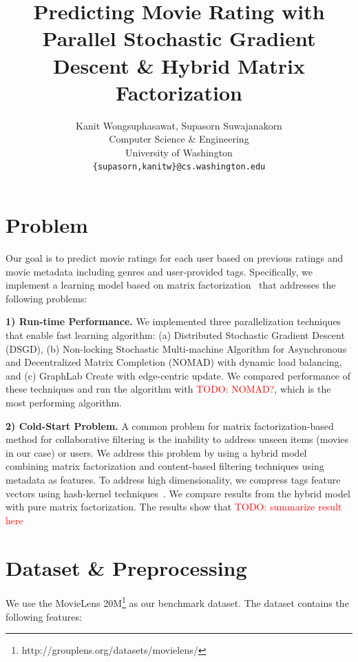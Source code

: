 \documentclass{article} %
\title{Predicting Movie Rating with Parallel Stochastic Gradient Descent \& Hybrid Matrix Factorization}
\author{
Kanit Wongsuphasawat, Supasorn Suwajanakorn \\
Computer Science \& Engineering\\
University of Washington\\
\texttt{\{supasorn,kanitw\}@cs.washington.edu} \\
}
\newcommand{\todo}[1]{\textcolor{red}{TODO: #1}}
\begin{document}
\maketitle



\section{Problem}

Our goal is to predict movie ratings for each user based on previous ratings
and movie metadata including genres and user-provided tags.
Specifically, we implement a learning model based on matrix
factorization~\cite{koren:matrix} that addresses the following problems:

\textbf{1) Run-time Performance.}
We implemented three parallelization techniques that enable fast
learning algorithm:
(a) Distributed Stochastic Gradient Descent (DSGD),
(b) Non-locking Stochastic Multi-machine Algorithm for Asynchronous and Decentralized Matrix Completion (NOMAD) with dynamic load balancing, and
(c) GraphLab Create with edge-centric update.
We compared performance of these techniques and run the algorithm with
\todo{NOMAD?}, which is the most performing algorithm.


\textbf{2) Cold-Start Problem.}
A common problem for matrix factorization-based method for collaborative
filtering is the inability to address unseen items (movies in our case) or
users.  We address this problem by using a hybrid model combining matrix
factorization and content-based filtering techniques using metadata as
features. To address high dimensionality, we compress tags feature vectors
using hash-kernel techniques~\cite{shi:hashkernels}.  We compare results
from the hybrid model with pure matrix factorization.  The results show that \todo{summarize result here}


\section{Dataset \& Preprocessing}

We use the MovieLens 20M\footnote{http://grouplens.org/datasets/movielens/}
as our benchmark dataset.  The dataset contains the following features:
\end{document}
